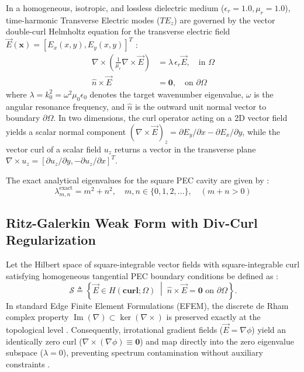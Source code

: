 \documentclass[preprint,12pt]{elsarticle}
\begin{document}
In a homogeneous, isotropic, and lossless dielectric medium ($\epsilon_r = 1.0, \mu_r = 1.0$), time-harmonic Transverse Electric modes ($TE_z$) are governed by the vector double-curl Helmholtz equation for the transverse electric field $\vec{E}(\mathbf{x}) = [E_x(x,y), E_y(x,y)]^T$ \cite{monk2003finite, ortiz2023tese}:
\begin{align}
\nabla \times \left( \frac{1}{\mu_r} \nabla \times \vec{E} \right) &= \lambda \, \epsilon_r \vec{E}, \quad \text{in } \Omega \label{eq:helmholtz_strong} \\
\hat{n} \times \vec{E} &= \mathbf{0}, \quad \text{on } \partial\Omega \label{eq:pec_boundary}
\end{align}
where $\lambda = k_0^2 = \omega^2 \mu_0 \epsilon_0$ denotes the target wavenumber eigenvalue, $\omega$ is the angular resonance frequency, and $\hat{n}$ is the outward unit normal vector to boundary $\partial\Omega$. In two dimensions, the curl operator acting on a 2D vector field yields a scalar normal component $(\nabla \times \vec{E})_z = \partial E_y/\partial x - \partial E_x/\partial y$, while the vector curl of a scalar field $u_z$ returns a vector in the transverse plane $\nabla \times u_z = [\partial u_z/\partial y, -\partial u_z/\partial x]^T$.

The exact analytical eigenvalues for the square PEC cavity are given by \cite{harrington2001time}:
\begin{equation}
\lambda_{m,n}^{\mathrm{exact}} = m^2 + n^2, \quad m,n \in \{0, 1, 2, \dots\}, \quad (m+n > 0)
\label{eq:analytical_eigenvalues}
\end{equation}

\subsection{Ritz-Galerkin Weak Form with Div-Curl Regularization}
\label{subsec:weak_form_regularization}
Let the Hilbert space of square-integrable vector fields with square-integrable curl satisfying homogeneous tangential PEC boundary conditions be defined as \cite{monk2003finite, bossavit1998computational}:
\begin{equation}
\mathcal{S} \triangleq \left\{ \vec{E} \in H(\mathbf{curl}; \Omega) \;\middle|\; \hat{n} \times \vec{E} = \mathbf{0} \text{ on } \partial\Omega \right\}.
\label{eq:hilbert_space_S}
\end{equation}
In standard Edge Finite Element Formulations (EFEM), the discrete de Rham complex property $\operatorname{Im}(\nabla) \subset \ker(\nabla \times)$ is preserved exactly at the topological level \cite{monk2003finite, bossavit1990spurious}. Consequently, irrotational gradient fields ($\vec{E} = \nabla \phi$) yield an identically zero curl ($\nabla \times (\nabla \phi) \equiv \mathbf{0}$) and map directly into the zero eigenvalue subspace ($\lambda = 0$), preventing spectrum contamination without auxiliary constraints \cite{monk2003finite, boffi1999computational}.
\end{document}
